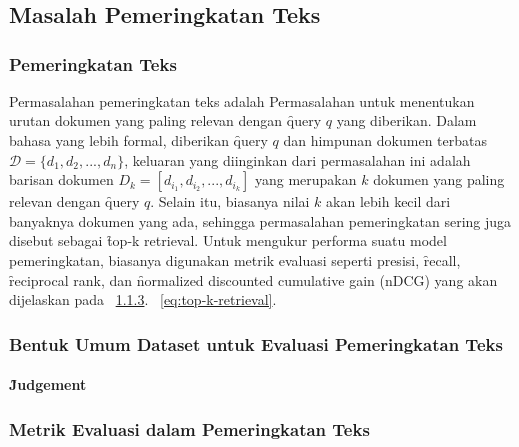 \chapter{\babDua}
\label{bab:2}

\noindent\todo{

}

\section{Masalah Pemeringkatan Teks}
    \subsection{Pemeringkatan Teks}

    Permasalahan pemeringkatan teks adalah Permasalahan untuk menentukan urutan dokumen yang paling relevan dengan \f{query} $q$ yang diberikan. Dalam bahasa yang lebih formal, diberikan \f{query} $q$ dan himpunan dokumen terbatas $\mathcal{D}= \{d_1, d_2, ..., d_n\}$, keluaran yang diinginkan dari permasalahan ini adalah barisan dokumen $D_k = [d_{i_1}, d_{i_2}, ..., d_{i_k}]$ yang merupakan $k$ dokumen yang paling relevan dengan \f{query} $q$. Selain itu, biasanya nilai $k$ akan lebih kecil dari banyaknya dokumen yang ada, sehingga permasalahan pemeringkatan sering juga disebut sebagai \f{top-k retrieval}. Untuk mengukur performa suatu model pemeringkatan, biasanya digunakan metrik evaluasi seperti presisi, \f{recall}, \f{reciprocal rank}, dan \f{normalized discounted cumulative gain} (nDCG) yang akan dijelaskan pada \sect~\ref{sec:metrik-evaluasi}. \equ~\ref{eq:top-k-retrieval}.

    \subsection{Bentuk Umum Dataset untuk Evaluasi Pemeringkatan Teks}
    \label{sec:dataset-umum}
    


        \subsubsection{\f{Judgement}}
    

    \subsection{Metrik Evaluasi dalam Pemeringkatan Teks}
    \label{sec:metrik-evaluasi}
